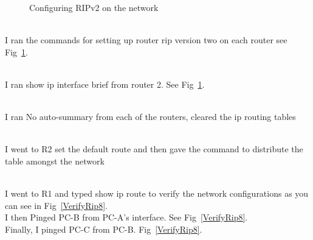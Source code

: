 \documentclass[../EngineeringJournal_CDavis.tex]{subfiles}
\begin{document}
\newpage



\begin{figure}[!b]\centering
{}\hfill
{}\par 
\caption{Configuring RIPv2 on the network}\label{ipbrief8}
\end{figure}

\\
I ran the commands for setting up router rip version two on each router see
Fig~\ref{ipbrief8}.


\noindent{}\\
I ran show ip interface brief from router 2. See Fig~\ref{ipbrief8}.


\noindent{}\\
I ran No auto-summary from each of the routers, cleared the ip routing tables


\noindent{}\\
I went to R2 set the default route and then gave the command to distribute the table amongst the network


\noindent{}\\
I went to R1 and typed show ip route to verify the network configurations as you can
see in Fig~\ref{VerifyRip8}.\\
I then Pinged PC-B from PC-A's interface. See
Fig~\ref{VerifyRip8}.\\
Finally, I pinged PC-C from PC-B. Fig~\ref{VerifyRip8}.
\end{document}
